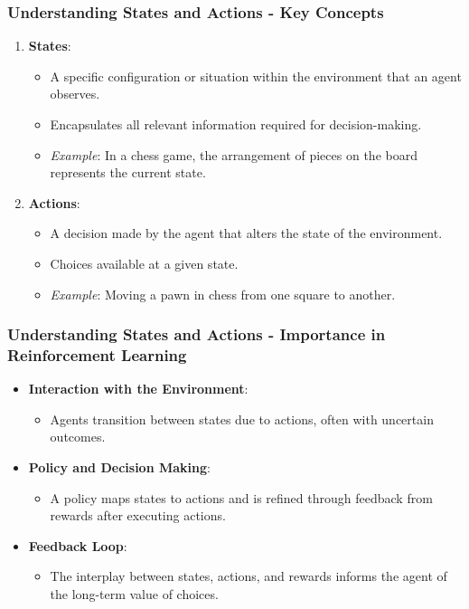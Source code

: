 \documentclass[aspectratio=169]{beamer}
\begin{document}
\begin{frame}[fragile]
    \frametitle{Understanding States and Actions - Key Concepts}
    \begin{enumerate}
        \item \textbf{States}:
        \begin{itemize}
            \item A specific configuration or situation within the environment that an agent observes.
            \item Encapsulates all relevant information required for decision-making.
            \item \textit{Example}: In a chess game, the arrangement of pieces on the board represents the current state.
        \end{itemize}

        \item \textbf{Actions}:
        \begin{itemize}
            \item A decision made by the agent that alters the state of the environment.
            \item Choices available at a given state.
            \item \textit{Example}: Moving a pawn in chess from one square to another.
        \end{itemize}
    \end{enumerate}
\end{frame}

\begin{frame}[fragile]
    \frametitle{Understanding States and Actions - Importance in Reinforcement Learning}
    \begin{itemize}
        \item \textbf{Interaction with the Environment}:
        \begin{itemize}
            \item Agents transition between states due to actions, often with uncertain outcomes.
        \end{itemize}

        \item \textbf{Policy and Decision Making}:
        \begin{itemize}
            \item A policy maps states to actions and is refined through feedback from rewards after executing actions.
        \end{itemize}

        \item \textbf{Feedback Loop}:
        \begin{itemize}
            \item The interplay between states, actions, and rewards informs the agent of the long-term value of choices.
        \end{itemize}
    \end{itemize}
\end{frame}
\end{document}
